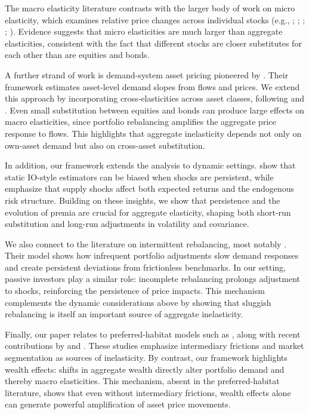 The macro elasticity literature contrasts with the larger body of work on micro elasticity, which examines relative price changes across individual stocks (e.g., \citealp{Shleifer/1986}; \citealp{Harris/Gurel/1986}; \citealp{chang2015regression}; \citealp{pavlova2021benchmarking}; \citealp{Schmickler/2020}). Evidence suggests that micro elasticities are much larger than aggregate elasticities, consistent with the fact that different stocks are closer substitutes for each other than are equities and bonds. 

A further strand of work is demand-system asset pricing pioneered by \cite{Koijen/Yogo/19}. Their framework estimates asset-level demand slopes from flows and prices. We extend this approach by incorporating cross-elasticities across asset classes, following \cite{fuchs2023demand} and \cite{haddad2025causal}. Even small substitution between equities and bonds can produce large effects on macro elasticities, since portfolio rebalancing amplifies the aggregate price response to flows. This highlights that aggregate inelasticity depends not only on own-asset demand but also on cross-asset substitution. 

In addition, our framework extends the analysis to dynamic settings. \cite{Binsbergen-David-Opp2025} show that static IO-style estimators can be biased when shocks are persistent, while \cite{he-kondor-Li2025demand} emphasize that supply shocks affect both expected returns and the endogenous risk structure. Building on these insights, we show that persistence and the evolution of premia are crucial for aggregate elasticity, shaping both short-run substitution and long-run adjustments in volatility and covariance. 

We also connect to the literature on intermittent rebalancing, most notably \cite{ChienColeLustig2012}. Their model shows how infrequent portfolio adjustments slow demand responses and create persistent deviations from frictionless benchmarks. In our setting, passive investors play a similar role: incomplete rebalancing prolongs adjustment to shocks, reinforcing the persistence of price impacts. This mechanism complements the dynamic considerations above by showing that sluggish rebalancing is itself an important source of aggregate inelasticity. 

Finally, our paper relates to preferred-habitat models such as \cite{VayanosVila2021}, along with recent contributions by \cite{KekreLenelMainardi2025} and \cite{RayDroste2025}. These studies emphasize intermediary frictions and market segmentation as sources of inelasticity. By contrast, our framework highlights wealth effects: shifts in aggregate wealth directly alter portfolio demand and thereby macro elasticities. This mechanism, absent in the preferred-habitat literature, shows that even without intermediary frictions, wealth effects alone can generate powerful amplification of asset price movements. 


